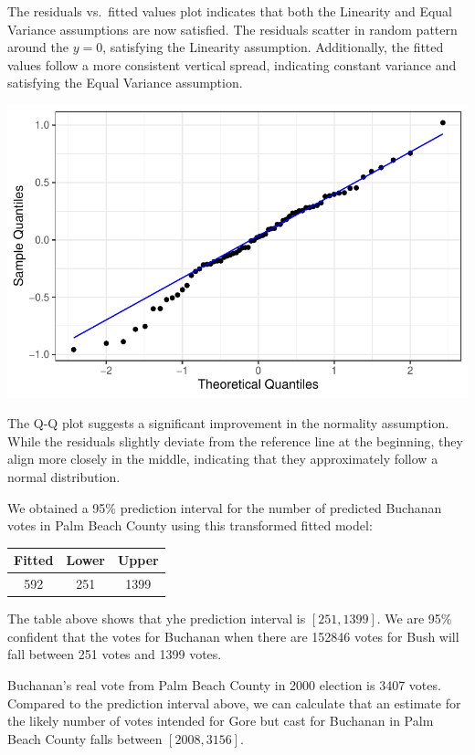 \documentclass[
  letterpaper,
  DIV=11,
  numbers=noendperiod]{scrartcl}
\begin{document}
The residuals vs.~fitted values plot indicates that both the Linearity
and Equal Variance assumptions are now satisfied. The residuals scatter
in random pattern around the \(y = 0\), satisfying the Linearity
assumption. Additionally, the fitted values follow a more consistent
vertical spread, indicating constant variance and satisfying the Equal
Variance assumption.

\includegraphics{SDS-291-case-study-1_files/figure-pdf/unnamed-chunk-10-1.pdf}

The Q-Q plot suggests a significant improvement in the normality
assumption. While the residuals slightly deviate from the reference line
at the beginning, they align more closely in the middle, indicating that
they approximately follow a normal distribution.

We obtained a 95\% prediction interval for the number of predicted
Buchanan votes in Palm Beach County using this transformed fitted model:

\begin{table}[H]
\centering
\begin{tabular}[t]{ccc}
\toprule
Fitted & Lower & Upper\\
\midrule
592 & 251 & 1399\\
\bottomrule
\end{tabular}
\end{table}

The table above shows that yhe prediction interval is \([251, 1399]\).
We are 95\% confident that the votes for Buchanan when there are 152846
votes for Bush will fall between 251 votes and 1399 votes.

Buchanan's real vote from Palm Beach County in 2000 election is 3407
votes. Compared to the prediction interval above, we can calculate that
an estimate for the likely number of votes intended for Gore but cast
for Buchanan in Palm Beach County falls between \([2008, 3156]\).
\end{document}
